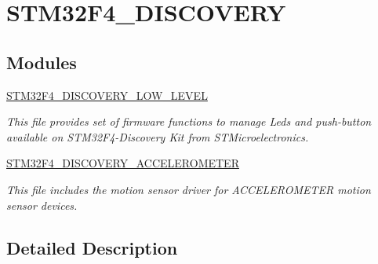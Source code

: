 \hypertarget{group__STM32F4__DISCOVERY}{\section{S\-T\-M32\-F4\-\_\-\-D\-I\-S\-C\-O\-V\-E\-R\-Y}
\label{group__STM32F4__DISCOVERY}
}
\subsection*{Modules}
\begin{DoxyCompactItemize}
\item 
\hyperlink{group__STM32F4__DISCOVERY__LOW__LEVEL}{S\-T\-M32\-F4\-\_\-\-D\-I\-S\-C\-O\-V\-E\-R\-Y\-\_\-\-L\-O\-W\-\_\-\-L\-E\-V\-E\-L}
\begin{DoxyCompactList}\small\item\em This file provides set of firmware functions to manage Leds and push-\/button available on S\-T\-M32\-F4-\/\-Discovery Kit from S\-T\-Microelectronics. \end{DoxyCompactList}\item 
\hyperlink{group__STM32F4__DISCOVERY__ACCELEROMETER}{S\-T\-M32\-F4\-\_\-\-D\-I\-S\-C\-O\-V\-E\-R\-Y\-\_\-\-A\-C\-C\-E\-L\-E\-R\-O\-M\-E\-T\-E\-R}
\begin{DoxyCompactList}\small\item\em This file includes the motion sensor driver for A\-C\-C\-E\-L\-E\-R\-O\-M\-E\-T\-E\-R motion sensor devices. \end{DoxyCompactList}\end{DoxyCompactItemize}


\subsection{Detailed Description}
